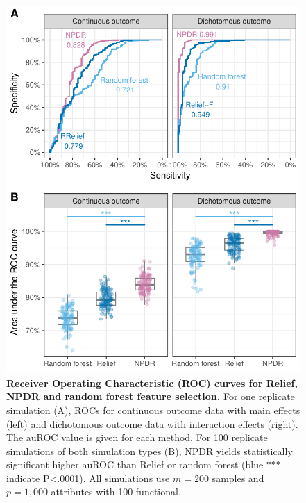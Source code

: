\documentclass{article}
\begin{document}
\begin{figure}[h]%
\centerline{\includegraphics[]{../figs/roc_compare_100.pdf}}
\caption{\textbf{Receiver Operating Characteristic (ROC) curves for Relief, NPDR and random forest feature selection.} For one replicate simulation (A), ROCs for continuous outcome data with main effects (left) and dichotomous outcome data with interaction effects (right). The auROC value is given for each method. For 100 replicate simulations of both simulation types (B), NPDR yields statistically significant higher auROC than Relief or random forest (blue $\ast$$\ast$$\ast$ indicate P<.0001). All simulations use $m = 200$ samples and $p = 1,000$ attributes with 100 functional.}
\label{fig:auROC}
\end{figure}
\end{document}
